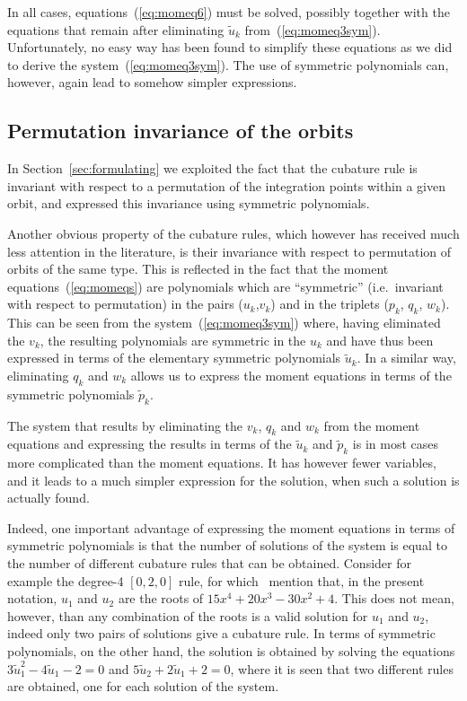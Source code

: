 \documentclass{article}
\begin{document}
In all cases, equations~(\ref{eq:momeq6}) must be solved, possibly together with the equations that remain after eliminating $\tilde{u}_k$ from~(\ref{eq:momeq3sym}). Unfortunately, no easy way has been found to simplify these equations as we did to derive the system~(\ref{eq:momeq3sym}). The use of symmetric polynomials can, however, again lead to somehow simpler expressions.




\subsection{Permutation invariance of the orbits}
\label{sec:orbinv}

In Section~\ref{sec:formulating} we exploited the fact that the cubature rule is invariant with respect to a permutation of the integration points within a given orbit, and expressed this invariance using symmetric polynomials.

Another obvious property of the cubature rules, which however has received much less attention in the literature, is their invariance with respect to permutation of orbits of the same type. This is reflected in the fact that the moment equations~(\ref{eq:momeqs}) are polynomials which are ``symmetric'' (i.e.\ invariant with respect to permutation) in the pairs ($u_k$,$v_k$) and in the triplets ($p_k$, $q_k$, $w_k$). This can be seen from the system~(\ref{eq:momeq3sym}) where, having eliminated the $v_k$, the resulting polynomials are symmetric in the $u_k$ and have thus been expressed in terms of the elementary symmetric polynomials $\tilde{u}_k$. In a similar way, eliminating $q_k$ and $w_k$ allows us to express the moment equations in terms of the symmetric polynomials $\tilde{p}_k$.

The system that results by eliminating the $v_k$, $q_k$ and $w_k$ from the moment equations and expressing the results in terms of the $\tilde{u}_k$ and $\tilde{p}_k$ is in most cases more complicated than the moment equations. It has however fewer variables, and it leads to a much simpler expression for the solution, when such a solution is actually found.

Indeed, one important advantage of expressing the moment equations in terms of symmetric polynomials is that the number of solutions of the system is equal to the number of different cubature rules that can be obtained. Consider for example the degree-4 $[0,2,0]$ rule, for which~\citet{LynessJespersen1975} mention that, in the present notation, $u_1$ and $u_2$ are the roots of $15 x^4 + 20 x^3 - 30 x^2 + 4$. This does not mean, however, than any combination of the roots is a valid solution for $u_1$ and $u_2$, indeed only two pairs of solutions give a cubature rule. In terms of symmetric polynomials, on the other hand, the solution is obtained by solving the equations $3\tilde{u}_1^2-4\tilde{u}_1-2 = 0$ and $5\tilde{u}_2+2\tilde{u}_1+2 = 0$, where it is seen that two different rules are obtained, one for each solution of the system.
\end{document}
